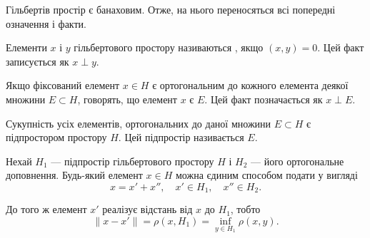 Гільбертів простір є банаховим. Отже, на нього
переносяться всі попередні означення і факти.

\begin{definition}
Елементи $x$ і $y$ гільбертового простору
називаються , якщо $(x, y) = 0$.
Цей факт записується як $x \perp y$.
\end{definition}

\begin{definition}
Якщо фіксований елемент $x \in H$ є
ортогональним до кожного елемента деякої множини
$E \subset H$, говорять, що елемент $x$ є
 $E$.
Цей факт позначається як $x \perp E$.
\end{definition}

\begin{definition}
Сукупність усіх елементів, ортогональних до
даної множини $E \subset H$ є підпростором простору $H$.
Цей підпростір називається  $E$.
\end{definition}

\begin{theorem}[Релліха]
Нехай $H_1$ --- підпростір гільбертового
простору $H$ і $H_2$ --- його ортогональне доповнення.
Будь-який елемент $x \in H$ можна єдиним способом
подати у вигляді
\begin{equation}
    \label{eq:16.5}
    x = x' + x'', \quad x' \in H_1, \quad x'' \in H_2.
\end{equation}

До того ж елемент $x'$ реалізує відстань від $x$ до $H_1$,
тобто
\begin{equation*}
    \|x - x'\| = \rho(x, H_1) = \inf_{y \in H_1} \rho(x, y).
\end{equation*}
\end{theorem}

